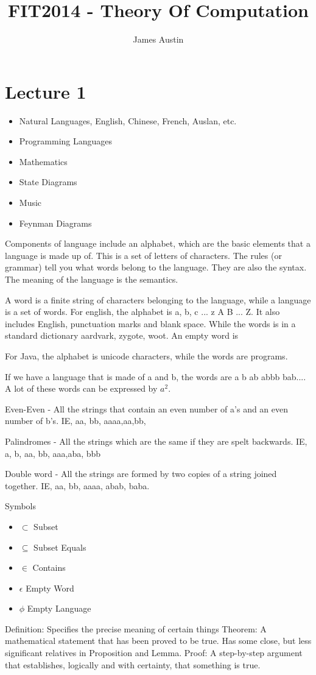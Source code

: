 \documentclass[11pt, oneside]{article}   	%
\title{FIT2014 - Theory Of Computation}
\author{James Austin}
\begin{document}
\maketitle
\section{Lecture 1}

\begin{itemize}
\item Natural Languages, English, Chinese, French, Auslan, etc.
\item Programming Languages
\item Mathematics
\item State Diagrams
\item Music
\item Feynman Diagrams
\end{itemize}

Components of language include an alphabet, which are the basic elements that a language is made up of. This is a set of letters of characters. The rules (or grammar) tell you what words belong to the language. They are also the syntax. The meaning of the language is the semantics.

A word is a finite string of characters belonging to the language, while a language is a set of words. For english, the alphabet is a, b, c ... z A B ... Z. It also includes English, punctuation marks and blank space. While the words is in a standard dictionary aardvark, zygote, woot. An empty word is 

For Java, the alphabet is unicode characters, while the words are programs. 

If we have a language that is made of a and b, the words are a b ab abbb bab.... A lot of these words can be expressed by $a^2$.

Even-Even - All the strings that contain an even number of a's and an even number of b's. IE, aa, bb, aaaa,aa,bb,

Palindromes - All the strings which are the same if they are spelt backwards. IE, a, b, aa, bb, aaa,aba, bbb

Double word - All the strings are formed by two copies of a string joined together. IE, aa, bb, aaaa, abab, baba.

Symbols\\
\begin{itemize}
\item $\subset$ Subset
\item $\subseteq$ Subset Equals
\item $\in$ Contains 
\item $\epsilon$      Empty Word 
\item $\phi$ Empty Language
\end{itemize}
Definition: Specifies the precise meaning of certain things
Theorem: A mathematical statement that has been proved to be true. Has some close, but less significant relatives in Proposition and Lemma.
Proof: A step-by-step argument that establishes, logically and with certainty, that something is true.
\end{document}
